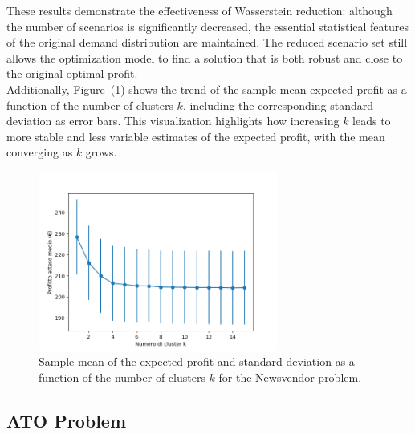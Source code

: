\documentclass[a4paper,12pt]{article}
\begin{document}
	\noindent These results demonstrate the effectiveness of Wasserstein reduction: although the number of scenarios is significantly decreased, the essential statistical features of the original demand distribution are maintained. The reduced scenario set still allows the optimization model to find a solution that is both robust and close to the original optimal profit.\\
	
	\noindent
	Additionally, Figure~(\ref{fig:rendimentoWass-nv}) shows the trend of the sample mean expected profit as a function of the number of clusters $k$, including the corresponding standard deviation as error bars. This visualization highlights how increasing $k$ leads to more stable and less variable estimates of the expected profit, with the mean converging as $k$ grows.
	
	\begin{figure}[H]
		\centering
		\includegraphics[width=0.7\textwidth]{../immagini/rendimentoWass_nv.png}
		\caption{Sample mean of the expected profit and standard deviation as a function of the number of clusters $k$ for the Newsvendor problem.}
		\label{fig:rendimentoWass-nv}
	\end{figure}	
	
	\subsection{ATO Problem}
	
\end{document}
